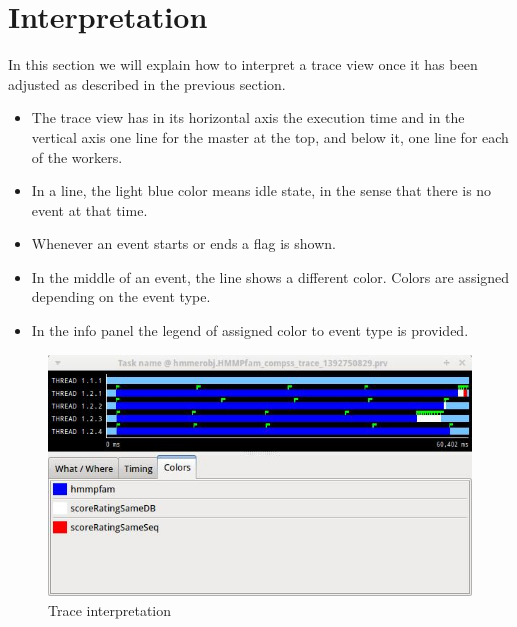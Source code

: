 \section{Interpretation}
\label{sec:Interpretation}

In this section we will explain how to interpret a trace view once it has been adjusted as 
described in the previous section.

\begin{itemize}
 \item The trace view has in its horizontal axis the execution time and in the vertical 
       axis one line for the master at the top, and below it, one line for each of the workers.
 \item In a line, the light blue color means idle state, in the sense that there is no event at that time.
 \item Whenever an event starts or ends a flag is shown.
 \item In the middle of an event, the line shows a different color. Colors are assigned depending on the event type.
 \item In the info panel the legend of assigned color to event type is provided.
\end{itemize}

\begin{figure}[ht!]
  \centering
    \includegraphics[width=\textwidth]{./Sections/4_Interpretation/Figures/7.jpeg}
    \caption{Trace interpretation}
\end{figure}